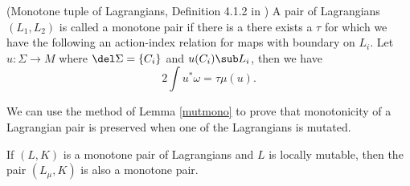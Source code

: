 \begin{defn}\label{defn:monotup}(Monotone tuple of Lagrangians, Definition 4.1.2 in \cite{quilt})
A pair of Lagrangians $(L_1,L_2)$ is called a monotone pair if there is a  there exists a $\tau$ for which we have the following an action-index relation for maps with boundary on $L_i$. Let $u : \Sigma\to M$ where $\del \Sigma = \{C_i\}$ and $u(C_i) \sub L_i$, then we have $$2\int u^*\omega = \tau \mu(u).$$
\end{defn}

\noindent We can use the method of Lemma \ref{mutmono} to prove that monotonicity of a Lagrangian pair is preserved when one of the Lagrangians is mutated.

\begin{lemma}\label{lemm:mutmonopair}
If $(L,K)$ is a monotone pair of Lagrangians and $L$ is locally mutable, then the pair $(L_\mu,K)$ is also a monotone pair.
\end{lemma}
